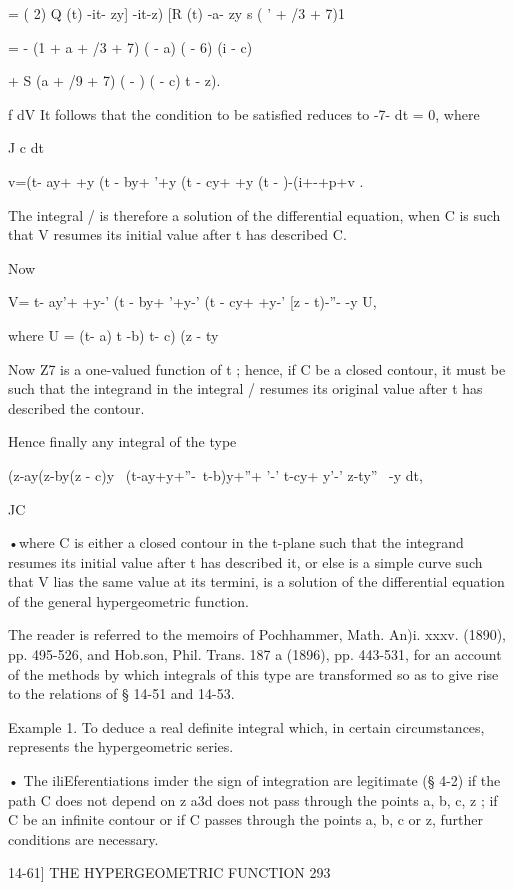 = ( 2) Q (t) -it- zy] -it-z) [R (t) -a- zy s ( ' + /3 + 7)1

= - (1 + a + /3 + 7) ( - a) ( - 6) (i - c)

+ S (a + /9 + 7) ( - ) ( - c) t - z).

f dV It follows that the condition to be satisfied reduces to -7- dt =
0, where

J c dt

v=(t- ay+ +y (t - by+ '+y (t - cy+ +y (t - )-(i+-+p+v .

The integral / is therefore a solution of the differential equation,
when C is such that V resumes its initial value after t has described
C.

Now

V= t- ay'+ +y-' (t - by+ '+y-' (t - cy+ +y-' [z - t)-''- -y U,

where U = (t- a) t -b) t- c) (z - ty\

Now Z7 is a one-valued function of t ; hence, if C be a closed
contour, it must be such that the integrand in the integral / resumes
its original value after t has described the contour.

Hence finally any integral of the type

(z-ay(z-by(z - c)y \ (t-ay+y+''-\ t-b)y+''+ '-' t-cy+ y'-' z-ty''~ -y
dt,

JC

•where C is either a closed contour in the t-plane such that the
integrand resumes its initial value after t has described it, or else
is a simple curve such that V lias the same value at its termini, is a
solution of the differential equation of the general hypergeometric
function.

The reader is referred to the memoirs of Pochhammer, Math. An)i. xxxv.
(1890), pp. 495-526, and Hob.son, Phil. Trans. 187 a (1896), pp.
443-531, for an account of the methods by which integrals of this type
are transformed so as to give rise to the relations of § 14-51 and
14-53.

Example 1. To deduce a real definite integral which, in certain
circumstances, represents the hypergeometric series.

• The iliEferentiations imder the sign of integration are legitimate
(§ 4-2) if the path C does not depend on z a3d does not pass through
the points a, b, c, z ; if C be an infinite contour or if C passes
through the points a, b, c or z, further conditions are necessary.

14-61] THE HYPERGEOMETRIC FUNCTION 293

